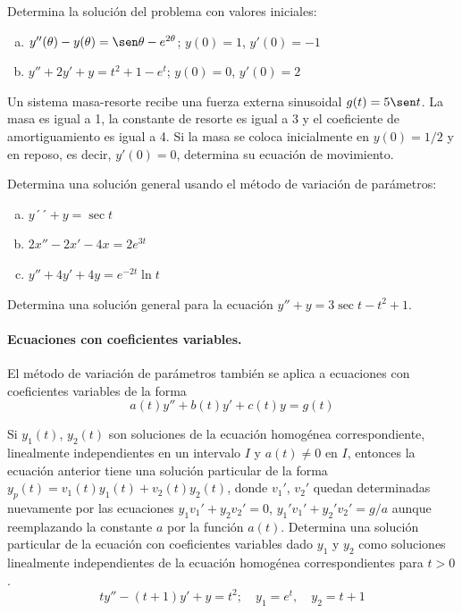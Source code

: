 \documentclass[12pt]{exam}
\begin{document}
\begin{questions}
     \question%
     Determina la solución del problema con valores iniciales:
     \begin{enumerate}[a)]
        \item	$y''(\theta)-y(\theta)=\sen\theta-e^{2\theta}$;  $y(0)=1$,  $y'(0)=-1$
        \item	$y''+2y'+y=t^2+1-e^t$;  $y(0)=0$,  $y'(0)=2$
     \end{enumerate}



     \question%
     Un sistema masa-resorte recibe una fuerza externa sinusoidal $g(t)=5\sen t$. La masa es igual a 1, la constante de resorte es igual a 3 y el coeficiente de amortiguamiento es igual a 4. Si la masa se coloca inicialmente en $y(0)=1/2$ y en reposo, es decir, $y'(0)=0$, determina su ecuación de movimiento.


     \question%
     Determina una solución general usando el método de variación de parámetros:
     \begin{enumerate}[a)]
     	\item $y´´+y=\sec t$
        \item $2x''-2x'-4x=2e^{3t}$
        \item $y''+4y'+4y=e^{-2t}\ln t$
\end{enumerate}


     
     
     \question%
     Determina una solución general para la ecuación $y''+y=3\sec t-t^2+1$.
     

     
     \paragraph{Ecuaciones con coeficientes variables.} El método de variación de parámetros también se aplica a ecuaciones con coeficientes variables de la forma $$a(t)y''+b(t)y'+c(t)y=g(t)$$
     
     Si $y_1(t)$, $y_2(t)$ son soluciones de la ecuación homogénea correspondiente, linealmente independientes en un intervalo $I$ y $a(t)\neq0$ en $I$, entonces la ecuación anterior tiene una solución particular de la forma $y_p(t)=v_1(t)y_1(t)+v_2(t)y_2(t)$, donde $v_1'$, $v_2'$ quedan determinadas nuevamente por las ecuaciones $y_1v_1'+y_2v_2'=0$, $y_1'v_1'+y_2'v_2'=g/a$ aunque reemplazando la constante $a$ por la función $a(t)$.
    \question%
     Determina una solución particular de la ecuación con coeficientes variables dado $y_1$ y $y_2$ como soluciones linealmente independientes de la ecuación homogénea correspondientes para $t>0$.$$ty''-(t+1)y'+y=t^2;\quad y_1=e^t,\quad y_2=t+1$$



\end{questions}
\end{document}

